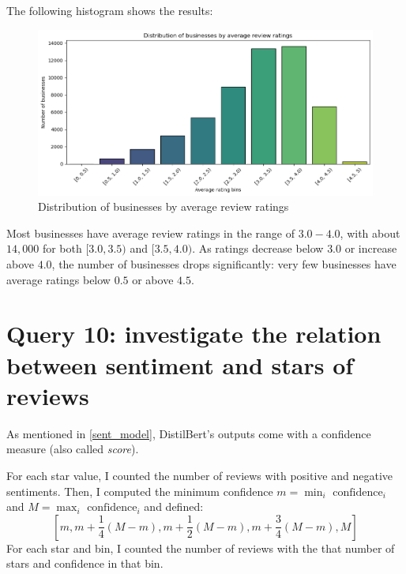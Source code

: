 \documentclass{Configuration_Files/PoliMi3i_thesis}
\begin{document}
\bigskip

The following histogram shows the results:

\bigskip

\begin{figure}[H]
    \centering
    \includegraphics[width=\columnwidth]{imgs/query_9.png}
    \caption{Distribution of businesses by average review ratings}
    \label{fig:query_9}
\end{figure}

\bigskip

Most businesses have average review ratings in the range of $3.0 - 4.0$, with about $14,000$ for both $[3.0, 3.5)$ and $[3.5, 4.0)$. As ratings decrease below $3.0$ or increase above $4.0$, the number of businesses drops significantly: very few businesses have average ratings below $0.5$ or above $4.5$.

\section{Query 10: investigate the relation between sentiment and stars of reviews}
As mentioned in \ref{sent_model}, DistilBert's outputs come with a confidence measure (also called \textit{score}). 

For each star value, I counted the number of reviews with positive and negative sentiments. Then, I computed the minimum confidence $m=\min_i\,\,\text{confidence}_i$ and $M=\max_i \,\, \text{confidence}_i$ and defined:
$$\left[m, m + \frac14(M-m), m+\frac12(M-m), m+\frac34(M-m), M\right]$$
For each star and bin, I counted the number of reviews with the that number of stars and confidence in that bin.
\end{document}
